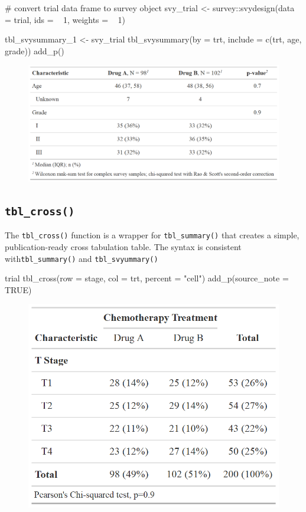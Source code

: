 \begin{example}
# convert trial data frame to survey object
svy_trial <- survey::svydesign(data = trial, ids = ~ 1, weights = ~ 1)

tbl_svysummary_1 <-
  svy_trial %
  tbl_svysummary(by = trt, include = c(trt, age, grade)) %
  add_p()
\end{example}
\begin{figure}[h!]
  \includegraphics[scale=0.28]{svysummary.png}
  \centering
\end{figure}

\subsection{\texorpdfstring{\texttt{tbl\_cross()}}{tbl\_cross()}}

The \texttt{tbl\_cross()} function is a wrapper for \texttt{tbl\_summary()} that creates a simple, publication-ready cross tabulation table. The syntax is consistent with\texttt{tbl\_summary()} and \texttt{tbl\_svyummary()}

\begin{example}
trial %
  tbl_cross(row = stage, col = trt, percent = "cell") %
  add_p(source_note = TRUE)
\end{example}
\begin{figure}[h!]
  \includegraphics[scale=0.28]{cross.png}
  \centering
\end{figure}


